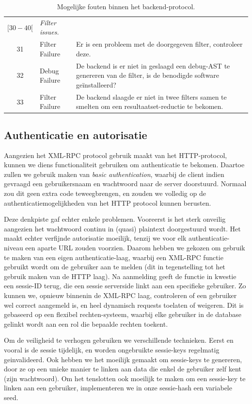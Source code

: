 \begin{table}
\begin{tabular}{| c p{4cm} p{7cm} |}
	$[30-40[$ & \emph{Filter issues.} & \\
	31 & Filter Failure & Er is een probleem met de doorgegeven filter, controleer deze. \\
	32 & Debug Failure & De backend is er niet in geslaagd een debug-AST te genereren van de filter, is de benodigde software ge\"installeerd? \\
	33 & Filter Failure & De backend slaagde er niet in twee filters samen te smelten om een resultaatset-reductie te bekomen. \\
	
	\hline
\end{tabular}
\caption{Mogelijke fouten binnen het backend-protocol.}
\label{tbl:real:xmlrpc:fouten}
\end{table}

\subsection{Authenticatie en autorisatie}

Aangezien het XML-RPC protocol gebruik maakt van het HTTP-protocol, kunnen we diens functionaliteit gebruiken om authenticatie te bekomen. Daartoe zullen we gebruik maken van \emph{basic authentication}, waarbij de client indien gevraagd een gebruikersnaam en wachtwoord naar de server doorstuurd. Normaal zou dit geen extra code teweegbrengen, en zouden we volledig op de authenticatiemogelijkheden van het HTTP protocol kunnen berusten.

Deze denkpiste gaf echter enkele problemen. Vooreerst is het sterk onveilig aangezien het wachtwoord continu in (quasi) plaintext doorgestuurd wordt. Het maakt echter verfijnde autorisatie moeilijk, tenzij we voor elk authenticatie-niveau een aparte URL zouden voorzien. Daarom hebben we gekozen om gebruik te maken van een eigen authenticatie-laag, waarbij een XML-RPC functie gebruikt wordt om de gebruiker aan te melden (dit in tegenstelling tot het gebruik maken van de HTTP laag). Na aanmelding geeft de functie in kwestie een sessie-ID terug, die een sessie serverside linkt aan een specifieke gebruiker. Zo kunnen we, opnieuw binnenin de XML-RPC laag, controleren of een gebruiker wel correct aangemeld is, en heel dynamisch requests toelaten of weigeren. Dit is gebaseerd op een flexibel rechten-systeem, waarbij elke gebruiker in de database gelinkt wordt aan een rol die bepaalde rechten toekent.

Om de veiligheid te verhogen gebruiken we verschillende technieken. Eerst en vooral is de sessie tijdelijk, en worden ongebruikte sessie-keys regelmatig geinvalideerd. Ook hebben we het moeilijk gemaakt om sessie-keys te genereren, door ze op een unieke manier te linken aan data die enkel de gebruiker zelf kent (zijn wachtwoord). Om het tenslotten ook moeilijk te maken om een sessie-key te linken aan een gebruiker, implementeren we in onze sessie-hash een variabele seed.

